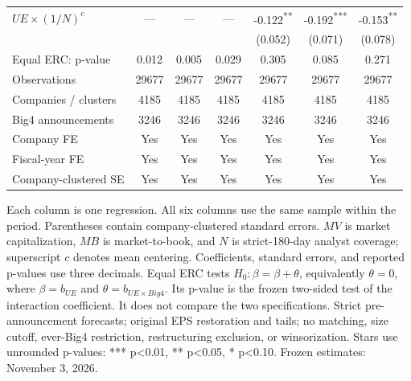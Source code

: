 \documentclass[10pt]{article}
\newcommand{\sym}[1]{\textsuperscript{#1}}
\begin{document}
\begin{tabular*}{\textwidth}{@{\extracolsep{\fill}}lcccccc@{}}
\(UE\times(1/N)^c\) & --- & --- & --- & -0.122\sym{**} & -0.192\sym{***} & -0.153\sym{**} \\
 &  &  &  & (0.052) & (0.071) & (0.078) \\
\midrule
Equal ERC: p-value & 0.012 & 0.005 & 0.029 & 0.305 & 0.085 & 0.271 \\
Observations & 29677 & 29677 & 29677 & 29677 & 29677 & 29677 \\
Companies / clusters & 4185 & 4185 & 4185 & 4185 & 4185 & 4185 \\
Big4 announcements & 3246 & 3246 & 3246 & 3246 & 3246 & 3246 \\
Company FE & Yes & Yes & Yes & Yes & Yes & Yes \\
Fiscal-year FE & Yes & Yes & Yes & Yes & Yes & Yes \\
Company-clustered SE & Yes & Yes & Yes & Yes & Yes & Yes \\
\bottomrule\end{tabular*}\par\medskip
\noindent\footnotesize Each column is one regression. All six columns use the same sample within the period. Parentheses contain company-clustered standard errors. \(MV\) is market capitalization, \(MB\) is market-to-book, and \(N\) is strict-180-day analyst coverage; superscript \(c\) denotes mean centering. Coefficients, standard errors, and reported p-values use three decimals. Equal ERC tests \(H_0:\beta=\beta+\theta\), equivalently \(\theta=0\), where \(\beta=b_{UE}\) and \(\theta=b_{UE\times Big4}\). Its p-value is the frozen two-sided test of the interaction coefficient. It does not compare the two specifications. Strict pre-announcement forecasts; original EPS restoration and tails; no matching, size cutoff, ever-Big4 restriction, restructuring exclusion, or winsorization. Stars use unrounded p-values: *** p<0.01, ** p<0.05, * p<0.10. Frozen estimates: November 3, 2026.
\end{document}

